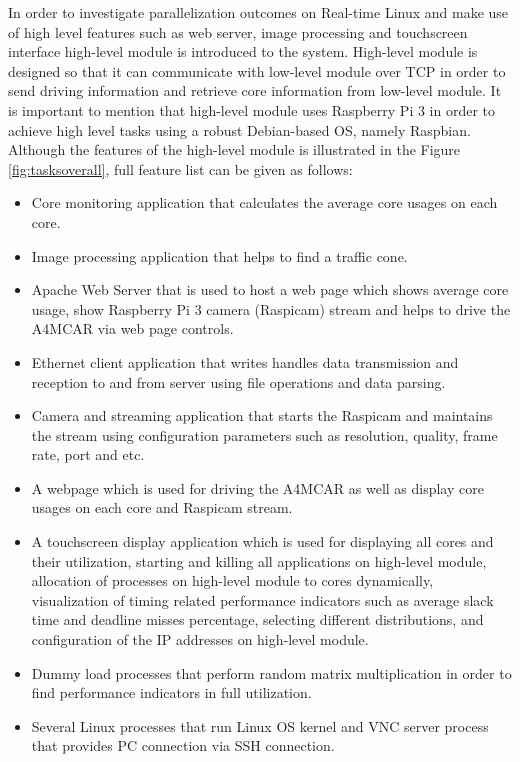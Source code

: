In order to investigate parallelization outcomes on Real-time Linux and make use of high level features such as web server, image processing and touchscreen interface high-level module is introduced to the system. High-level module is designed so that it can communicate with low-level module over TCP in order to send driving information and retrieve core information from low-level module. It is important to mention that high-level module uses Raspberry Pi 3 in order to achieve high level tasks using a robust Debian-based OS, namely Raspbian. Although the features of the high-level module is illustrated in the Figure \ref{fig:tasksoverall}, full feature list can be given as follows:

\begin{itemize}
	\item Core monitoring application that calculates the average core usages on each core.
	\item Image processing application that helps to find a traffic cone.
	\item Apache Web Server that is used to host a web page which shows average core usage, show Raspberry Pi 3 camera (Raspicam) stream and helps to drive the A4MCAR via web page controls.
	\item Ethernet client application that writes handles data transmission and reception to and from server using file operations and data parsing.
	\item Camera and streaming application that starts the Raspicam and maintains the stream using configuration parameters such as resolution, quality, frame rate, port and etc.
	\item A webpage which is used for driving the A4MCAR as well as display core usages on each core and Raspicam stream.
	\item A touchscreen display application which is used for displaying all cores and their utilization, starting and killing all applications on high-level module, allocation of processes on high-level module to cores dynamically, visualization of timing related performance indicators such as average slack time and deadline misses percentage, selecting different distributions, and configuration of the IP addresses on high-level module.
	\item Dummy load processes that perform random matrix multiplication in order to find performance indicators in full utilization.
	\item Several Linux processes that run Linux OS kernel and VNC server process that provides PC connection via SSH connection.
\end{itemize}

